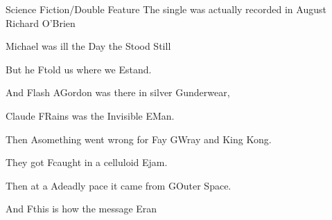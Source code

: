 \begin{SBSong}{Science Fiction/Double Feature}
    {The single was actually recorded in August}
    {Richard O'Brien }
  \begin{SBVerse}
    Michael  was ill the Day the  Stood Still
    
    But he Ftold us where we Estand.

    And Flash AGordon was there in silver Gunderwear,

    Claude FRains was the Invisible EMan.

    Then Asomething went wrong for Fay GWray and King Kong.

    They got Fcaught in a celluloid Ejam.

    Then at a Adeadly pace it came from GOuter Space.

    And Fthis is how the message Eran  
  \end{SBVerse}
  \begin{SBChorus}

  \end{SBChorus}
\end{SBSong}
